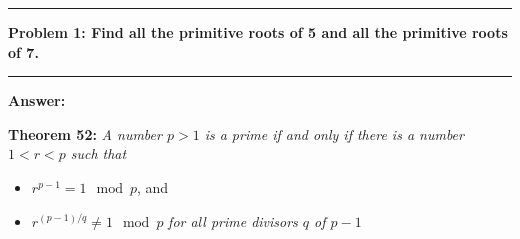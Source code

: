 \documentclass[11pt]{article}
\newcommand\question[2]{\vspace{.25in}\hrule\textbf{#1: #2}\vspace{.5em}\hrule\vspace{.10in}}
\renewcommand\part[1]{\vspace{.10in}\textbf{#1}}
\begin{document}
\raggedright
\newcommand\NAME{Shiang-Yun Yang 楊翔雲}  %
\newcommand\ANDREWID{R04922067}     %
\newcommand\HWNUM{4}              %



\question{Problem 1}{Find all the primitive roots of 5 and all the primitive roots of 7.}

\part{Answer:} 

\textbf{Theorem 52:} \textit{A number $p > 1$ is a prime if and only if there is a number $1 < r < p$ such that}

\begin{itemize}
	\item	$r^{p-1} = 1 \mod p$, and
	\item	$r^{(p-1)/q} \neq 1 \mod p$ \textit{ for all prime divisors $q$ of $p-1$}
\end{itemize}
\end{document}
